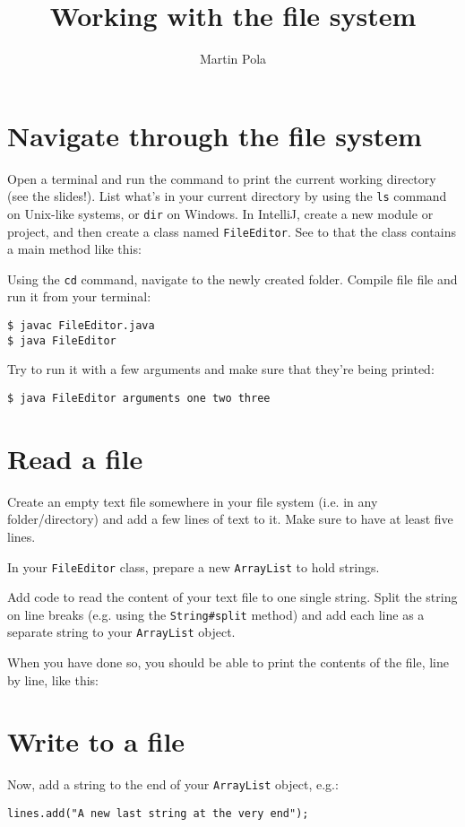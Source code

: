 \documentclass[a4paper, english]{article}
\title{Working with the file system}
\author{Martin Pola}
\date{}
\begin{document}
    \maketitle

    \section{Navigate through the file system}
        Open a terminal and run the command to print the current working directory (see the slides!). List what's in your current directory by using the \texttt{ls} command on Unix-like systems, or \texttt{dir} on Windows. In IntelliJ, create a new module or project, and then create a class named \texttt{FileEditor}. See to that the class contains a main method like this:
        

        Using the \texttt{cd} command, navigate to the newly created folder. Compile file file and run it from your terminal:
        \begin{lstlisting}
$ javac FileEditor.java
$ java FileEditor\end{lstlisting}

        Try to run it with a few arguments and make sure that they're being printed:
        \begin{lstlisting}
$ java FileEditor arguments one two three \end{lstlisting}

    \section{Read a file}
        Create an empty text file somewhere in your file system (i.e. in any folder/directory) and add a few lines of text to it. Make sure to have at least five lines.

        In your \texttt{FileEditor} class, prepare a new \texttt{ArrayList} to hold strings.
        
        Add code to read the content of your text file to one single string. Split the string on line breaks (e.g. using the \texttt{String\#split} method) and add each line as a separate string to your \texttt{ArrayList} object.

        When you have done so, you should be able to print the contents of the file, line by line, like this:
        
    
    \section{Write to a file}
        Now, add a string to the end of your \texttt{ArrayList} object, e.g.:
        \begin{lstlisting}[style=customjava]
lines.add("A new last string at the very end");\end{lstlisting}
\end{document}
